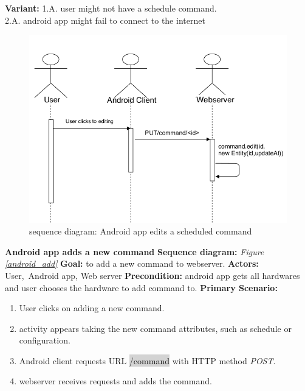 \documentclass[12pt, oneside, a4paper]{book}
\newcommand{\code}[1]{{\color{red}\colorbox{lightgray}{#1}}}
\newcommand\boldcolor[1]{\textcolor{bold}{\textbf{#1}}}
\begin{document}
				\textbf{Variant:}\newline
				\hspace*{5mm}1.A. user might not have a schedule command. \\
				\hspace*{5mm}2.A. android app might fail to connect to the internet \\
				\begin{figure}[H]
					\includegraphics[width=\linewidth]{img/sequence_android_edit.png}
					\caption{sequence diagram: Android app edits a scheduled command}
					\label{android_edit}
				\end{figure}
				\newpage\hspace*{-6mm}\boldcolor{Android app adds a new command}
				\newline\textbf{Sequence diagram:} \textit{Figure \ref{android_add}}
				\newline\textbf{Goal:} to add a new command to webserver.
				\newline\textbf{Actors:} User, Android app, Web server
				\newline\textbf{Precondition:} android app gets all hardwares and user chooses the hardware to add command to.
				\newline\textbf{Primary Scenario:}	
				\begin{enumerate}[label*=\arabic*.]
					\item User clicks on adding  a new command.
					\item activity appears taking the new command attributes, such as schedule or configuration.
					\item Android client requests URL \code{/command} with HTTP method \textit{POST}.
					\item  webserver receives requests and adds the command.
				\end{enumerate}
\end{document}
